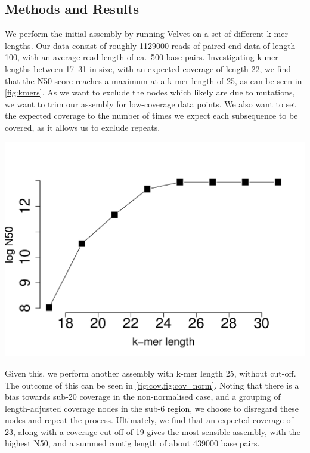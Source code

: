 \documentclass[10pt]{article}\usepackage[]{graphicx}\usepackage[]{color}
\makeatletter
\def\maxwidth{ %
  \ifdim\Gin@nat@width>\linewidth
    \linewidth
  \else
    \Gin@nat@width
  \fi
}
\newenvironment{knitrout}{}{} %
\theoremstyle{plain}
\theoremstyle{definition}
\makeatother
\begin{document}
\begin{multicols}{2}
\section{Methods and Results}
We perform the initial assembly by running Velvet on a set of different k-mer lengths. Our data consist of roughly 1129000 reads of paired-end data of length 100, with an average read-length of ca.\ 500 base pairs. Investigating k-mer lengths between 17--31 in size, with an expected coverage of length 22, we find that the N50 score reaches a maximum at a k-mer length of 25, as can be seen in \cref{fig:kmers}. As we want to exclude the nodes which likely are due to mutations, we want to trim our assembly for low-coverage data points. We also want to set the expected coverage to the number of times we expect each subsequence to be covered, as it allows us to exclude repeats.
\begin{minipage}{0.45\textwidth}
\begin{knitrout}
\color{fgcolor}
\includegraphics[width=\maxwidth]{figure/unnamed-chunk-1-1} 

\end{knitrout}
\label{fig:kmers}
\end{minipage}
\vspace{.5em}

Given this, we perform another assembly with k-mer length 25, without cut-off. The outcome of this can be seen in \cref{fig:cov,fig:cov_norm}. Noting that there is a bias towards sub-20 coverage in the non-normalised case, and a grouping of length-adjusted coverage nodes in the sub-6 region, we choose to disregard these nodes and repeat the process. Ultimately, we find that an expected coverage of 23, along with a coverage cut-off of 19 gives the most sensible assembly, with the highest N50, and a summed contig length of about 439000 base pairs.


\end{multicols}
\end{document}
